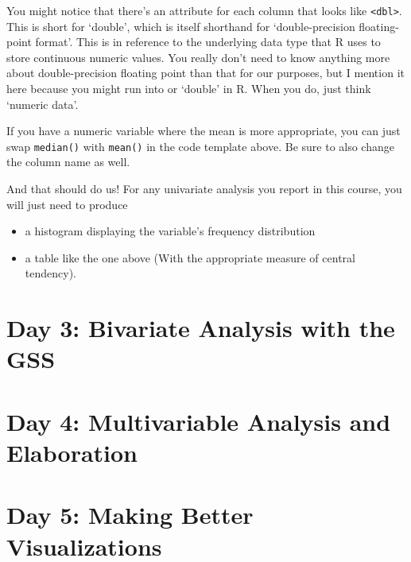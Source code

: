 \documentclass[
  letterpaper,
  DIV=11,
  numbers=noendperiod]{scrreprt}
\providecommand{\tightlist}{%
  \setlength{\itemsep}{0pt}\setlength{\parskip}{0pt}}
\begin{document}
\begin{tcolorbox}[enhanced jigsaw, colframe=quarto-callout-note-color-frame, arc=.35mm, coltitle=black, breakable, rightrule=.15mm, left=2mm, opacitybacktitle=0.6, colbacktitle=quarto-callout-note-color!10!white, toptitle=1mm, bottomtitle=1mm, titlerule=0mm, leftrule=.75mm, colback=white, title=\textcolor{quarto-callout-note-color}{\faInfo}\hspace{0.5em}{Note}, opacityback=0, bottomrule=.15mm, toprule=.15mm]

You might notice that there's an attribute for each column that looks
like \texttt{\textless{}dbl\textgreater{}}. This is short for `double',
which is itself shorthand for `double-precision floating-point format'.
This is in reference to the underlying data type that R uses to store
continuous numeric values. You really don't need to know anything more
about double-precision floating point than that for our purposes, but I
mention it here because you might run into or `double' in R. When you
do, just think `numeric data'.

\end{tcolorbox}

If you have a numeric variable where the mean is more appropriate, you
can just swap \texttt{median()} with \texttt{mean()} in the code
template above. Be sure to also change the column name as well.

And that should do us! For any univariate analysis you report in this
course, you will just need to produce

\begin{itemize}
\tightlist
\item
  a histogram displaying the variable's frequency distribution
\item
  a table like the one above (With the appropriate measure of central
  tendency).
\end{itemize}

\part{Day 3: Bivariate Analysis with the GSS}

\part{Day 4: Multivariable Analysis and Elaboration}

\part{Day 5: Making Better Visualizations}
\end{document}
